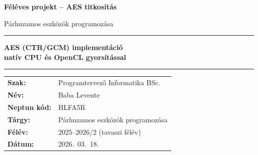 \begin{titlepage}
  \centering
  \vspace*{1.5cm}

  {\Large\bfseries Féléves projekt -- AES titkosítás\par}
  \vspace{0.8cm}
  {\large Párhuzamos eszközök programozása\par}

  \vspace{1.2cm}
  \rule{0.85\textwidth}{0.4pt}\par
  \vspace{0.4cm}
  {\LARGE\bfseries AES (CTR/GCM) implementáció\\
  natív CPU és OpenCL gyorsítással\par}
  \vspace{0.4cm}
  \rule{0.85\textwidth}{0.4pt}\par

  \vfill

  \begin{tabular}{@{}ll@{}}
    \textbf{Szak:} & Programtervező Informatika BSc. \\
    \textbf{Név:} & Baba Levente \\
    \textbf{Neptun kód:} & HLFA5R \\
    \textbf{Tárgy:} & Párhuzamos eszközök programozása \\
    \textbf{Félév:} & 2025--2026/2 (tavaszi félév) \\
    \textbf{Dátum:} & 2026.\ 03.\ 18. \\
  \end{tabular}

  \vspace*{1.5cm}
\end{titlepage}

\cleardoublepage
